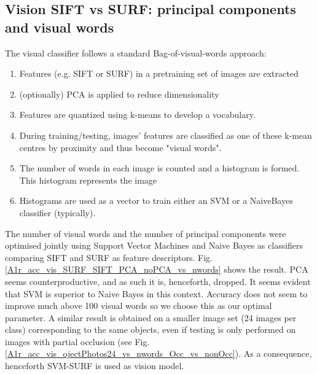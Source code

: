 \documentclass[]{article}
\begin{document}
\subsection{Vision SIFT vs SURF: principal components and visual words}
The visual classifier follows a standard Bag-of-visual-words approach:
\begin{enumerate} 
	\item Features (e.g. SIFT or SURF) in a pretraining set of images are extracted
	\item (optionally) PCA is applied to reduce dimensionality
	\item Features are quantized using k-means to develop a vocabulary. 
	\item During training/testing, images' features are classified as one of these k-mean centres by proximity and thus become "visual words". 
	\item The number of words in each image is counted and a histogram is formed. This histogram represents the image
	\item Histograms are used as a vector to train either an SVM or a NaiveBayes classifier (typically).
\end{enumerate}
The number of visual words and the number of principal components were optimised jointly using Support Vector Machines and Naive Bayes as classifiers comparing SIFT and SURF as feature descriptors. Fig. \ref{A1r_acc_vis_SURF_SIFT_PCA_noPCA_vs_nwords} shows the result. PCA seems counterproductive, and as such it is, henceforth, dropped. It seems evident that SVM is superior to Naive Bayes in this context. Accuracy does not seem to improve much above 100 visual words so we choose this as our optimal parameter. A similar result is obtained on a smaller image set (24 images per class) corresponding to the same objects, even if testing is only performed on images with partial occlusion (see Fig. \ref{A1r_acc_vis_ojectPhotos24_vs_nwords_Occ_vs_nonOcc}). As a consequence, henceforth SVM-SURF is used as vision model.
 
\begin{figure}
	\centering
	\end{figure}
 
\end{document}
